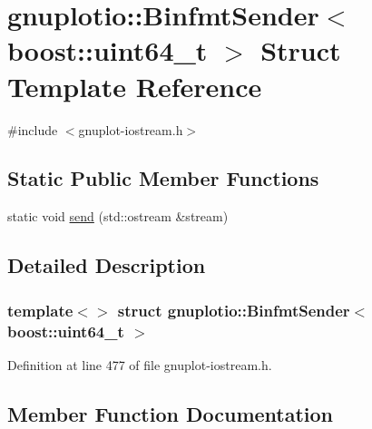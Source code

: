 \hypertarget{structgnuplotio_1_1_binfmt_sender_3_01boost_1_1uint64__t_01_4}{}\section{gnuplotio\+:\+:Binfmt\+Sender$<$ boost\+:\+:uint64\+\_\+t $>$ Struct Template Reference}
\label{structgnuplotio_1_1_binfmt_sender_3_01boost_1_1uint64__t_01_4}


{\ttfamily \#include $<$gnuplot-\/iostream.\+h$>$}

\subsection*{Static Public Member Functions}
\begin{DoxyCompactItemize}
\item 
static void \hyperlink{structgnuplotio_1_1_binfmt_sender_3_01boost_1_1uint64__t_01_4_a9f57162a6baf940675236235556f62ba}{send} (std\+::ostream \&stream)
\end{DoxyCompactItemize}


\subsection{Detailed Description}
\subsubsection*{template$<$$>$\newline
struct gnuplotio\+::\+Binfmt\+Sender$<$ boost\+::uint64\+\_\+t $>$}



Definition at line 477 of file gnuplot-\/iostream.\+h.



\subsection{Member Function Documentation}
\mbox{\label{structgnuplotio_1_1_binfmt_sender_3_01boost_1_1uint64__t_01_4_a9f57162a6baf940675236235556f62ba}} 
